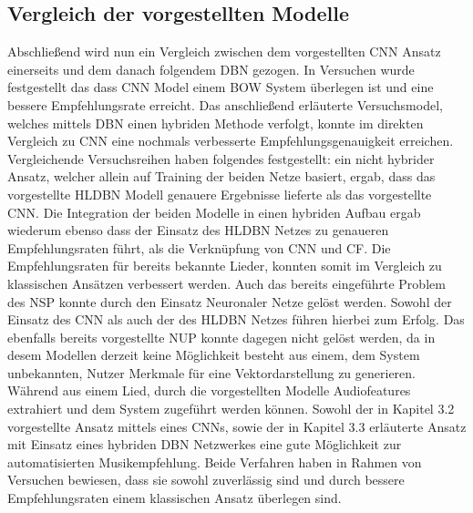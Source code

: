 \documentclass[twosided,a4,10pt]{article}
\begin{document}
\begin{multicols}{2}
		\section{Vergleich der vorgestellten Modelle}
		Abschließend wird nun ein Vergleich zwischen dem vorgestellten CNN Ansatz einerseits und dem danach folgendem DBN gezogen. In Versuchen \cite{oord} wurde festgestellt das dass CNN Model einem BOW System überlegen ist und eine bessere Empfehlungsrate erreicht. Das anschließend erläuterte  Versuchsmodel, welches mittels DBN einen hybriden Methode verfolgt, konnte im direkten Vergleich zu CNN eine nochmals verbesserte Empfehlungsgenauigkeit erreichen. Vergleichende Versuchsreihen \cite{wang} haben folgendes festgestellt: ein nicht hybrider Ansatz, welcher allein auf Training der beiden Netze basiert, ergab, dass das vorgestellte HLDBN Modell genauere Ergebnisse lieferte als das vorgestellte CNN. Die Integration der beiden Modelle in einen hybriden Aufbau ergab wiederum ebenso dass der Einsatz des HLDBN Netzes zu genaueren Empfehlungsraten führt, als die Verknüpfung von CNN und CF. Die Empfehlungsraten für bereits bekannte Lieder, konnten somit im Vergleich zu klassischen Ansätzen verbessert werden. Auch das bereits eingeführte Problem des NSP konnte durch den Einsatz Neuronaler Netze gelöst werden. Sowohl der Einsatz des CNN als auch der des HLDBN Netzes führen hierbei zum Erfolg. Das ebenfalls bereits vorgestellte NUP konnte dagegen nicht gelöst werden, da in desem Modellen derzeit keine Möglichkeit besteht aus einem, dem System unbekannten, Nutzer Merkmale für eine Vektordarstellung zu generieren. Während aus einem Lied, durch die vorgestellten Modelle Audiofeatures extrahiert und dem System zugeführt werden können.
		Sowohl der in Kapitel 3.2 vorgestellte Ansatz mittels eines CNNs, sowie der in Kapitel 3.3 erläuterte Ansatz mit Einsatz eines hybriden DBN Netzwerkes eine gute Möglichkeit zur automatisierten Musikempfehlung. Beide Verfahren haben in Rahmen von Versuchen bewiesen, dass sie sowohl zuverlässig sind und durch bessere Empfehlungsraten einem klassischen Ansatz überlegen sind.
		
		
	\end{multicols}
\end{document}
